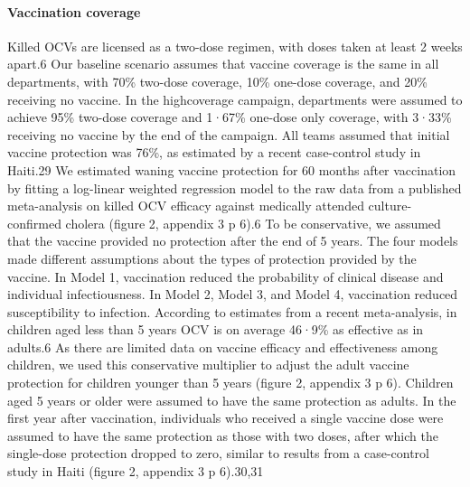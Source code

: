       \paragraph {Vaccination coverage} Killed OCVs are licensed as a two-dose regimen, with doses taken at least 2 weeks apart.6 Our baseline scenario assumes that vaccine coverage is the same in all departments, with 70\% two-dose coverage, 10\% one-dose coverage, and 20\% receiving no vaccine. In the highcoverage campaign, departments were assumed to achieve 95\% two-dose coverage and 1·67\% one-dose only coverage, with 3·33\% receiving no vaccine by the end of the campaign. All teams assumed that initial vaccine protection was 76\%, as estimated by a recent case-control study in Haiti.29 We estimated waning vaccine protection for 60 months after vaccination by fitting a log-linear weighted regression model to the raw data from a published meta-analysis on killed OCV efficacy against medically attended culture-confirmed cholera (figure 2, appendix 3 p 6).6 To be conservative, we assumed that the vaccine provided no protection after the end of 5 years. The four models made different assumptions about the types of protection provided by the vaccine. In Model 1, vaccination reduced the probability of clinical disease and individual infectiousness. In Model 2, Model 3, and Model 4, vaccination reduced susceptibility to infection. According to estimates from a recent meta-analysis, in children aged less than 5 years OCV is on average 46·9\% as effective as in adults.6 As there are limited data on vaccine efficacy and effectiveness among children, we used this conservative multiplier to adjust the adult vaccine protection for children younger than 5 years (figure 2, appendix 3 p 6). Children aged 5 years or older were assumed to have the same protection as adults. In the first year after vaccination, individuals who received a single vaccine dose were assumed to have the same protection as those with two doses, after which the single-dose protection dropped to zero, similar to results from a case-control study in Haiti (figure 2, appendix 3 p 6).30,31 
